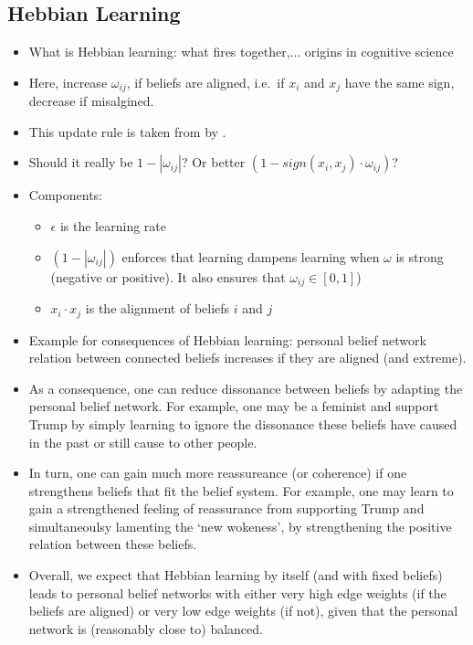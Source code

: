 \documentclass[10pt]{article}
\begin{document}
\subsection{Hebbian Learning}
\begin{itemize}
    \item What is Hebbian learning: what fires together,... \ra origins in cognitive science
    \item Here, increase $\omega_{ij}$, if beliefs are aligned, i.e.\ if $x_i$ and $x_j$ have the same sign, decrease if misalgined.
    \item This update rule is taken from by \cite{dalegeLearningIsingModel}.
    \item \TODO Should it really be $1-|\omega_{ij}|$? Or better $(1-sign(x_i, x_j)\cdot \omega_{ij})$?
    \item Components: 
    \begin{itemize}
        \item $\epsilon$ is the learning rate 
        \item $(1-|\omega_{ij}|)$ enforces that learning dampens learning when $\omega$ is strong (negative or positive). It also ensures that $\omega_{ij}\in [0,1]$)  
        \item $x_{i} \cdot x_{j}$ is the alignment of beliefs $i$ and $j$ 
    \end{itemize}
    \item Example for consequences of Hebbian learning: personal belief network relation between connected beliefs increases if they are aligned (and extreme).
    \item As a consequence, one can reduce dissonance between beliefs by adapting the personal belief network. For example, one may be a feminist and support Trump by simply learning to ignore the dissonance these beliefs have caused in the past or still cause to other people.
    \item In turn, one can gain much more reassureance (or coherence) if one strengthens beliefs that fit the belief system. For example, one may learn to gain a strengthened feeling of reassurance from supporting Trump and simultaneoulsy lamenting the `new wokeness', by strengthening the positive relation between these beliefs. 
    \item Overall, we expect that Hebbian learning by itself (and with fixed beliefs) leads to personal belief networks with either very high edge weights (if the beliefs are aligned) or very low edge weights (if not), given that the personal network is (reasonably close to) balanced.    
\end{itemize}
\end{document}
